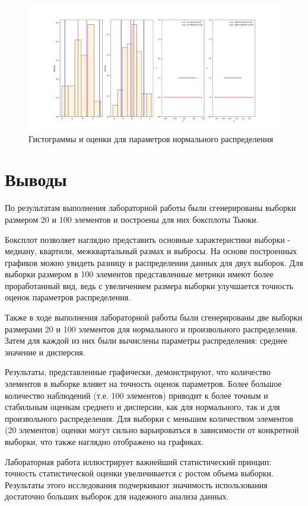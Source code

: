 \documentclass[12pt,a4paper]{article}
\begin{document}
	\begin{figure}[htbp!]
		\begin{center}
			\includegraphics[width = 1.12\linewidth]{graphics/hists.png}
			\caption{Гистограммы и оценки для параметров нормального распределения}
		\end{center}
	\end{figure}

	\vspace{10em}

	\section{Выводы}

	По результатам выполнения лабораторной работы были сгенерированы выборки размером 20 и 100 элементов и построены для них боксплоты Тьюки.

	Боксплот позволяет наглядно представить основные характеристики выборки - медиану, квартили, межквартальный размах и выбросы. На основе построенных графиков можно увидеть разницу в распределении данных для двух выборок. Для выборки размером в 100 элементов представленные метрики имеют более проработанный вид, ведь с увеличением размера выборки улучшается точность оценок параметров распределения.

	Также в ходе выполнения лабораторной работы были сгенерированы две выборки размерами 20 и 100 элементов для нормального и произвольного распределения. Затем для каждой из них были вычислены параметры распределения: среднее значение и дисперсия.

	Результаты, представленные графически, демонстрируют, что количество элементов в выборке влияет на точность оценок параметров. Более большое количество наблюдений (т.е. 100 элементов) приводит к более точным и стабильным оценкам среднего и дисперсии, как для нормального, так и для произвольного распределения. Для выборки с меньшим количеством элементов (20 элементов) оценки могут сильно варьироваться в зависимости от конкретной выборки, что также наглядно отображено на графиках.

	Лабораторная работа иллюстрирует важнейший статистический принцип: точность статистической оценки увеличивается с ростом объема выборки. Результаты этого исследования подчеркивают значимость использования достаточно больших выборок для надежного анализа данных.
\end{document}
